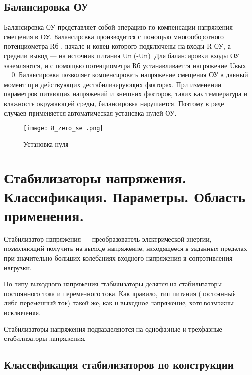 \subsection*{Балансировка ОУ}

Балансировка ОУ представляет собой операцию по компенсации напряжения смещения в ОУ. Балансировка производится с помощью многооборотного потенциометра Rб , начало и конец которого подключены на входы R ОУ, а средний вывод --- на источник питания Un (-Un). Для балансировки входы ОУ заземляются, и с помощью потенциометра Rб устанавливается напряжение Uвых = 0. Балансировка позволяет компенсировать напряжение смещения ОУ в данный момент при действующих дестабилизирующих факторах. При изменении параметров питающих напряжений и внешних факторов, таких как температура и влажность окружающей среды, балансировка нарушается. Поэтому в ряде случаев применяется автоматическая установка нулей ОУ.

\begin{figure}[H]
\centering
\texttt{[image: 8\_zero\_set.png]}
\caption{Установка нуля}
\label{fig:8_zero_set}
\end{figure}


\section{Стабилизаторы напряжения. Классификация. Параметры. Область применения.}

Стабилизатор напряжения --- преобразователь электрической энергии, позволяющий получить на выходе напряжение, находящееся в заданных пределах при значительно больших колебаниях входного напряжения и сопротивления нагрузки.

По типу выходного напряжения стабилизаторы делятся на стабилизаторы постоянного тока и переменного тока. Как правило, тип питания (постоянный либо переменный ток) такой же, как и выходное напряжение, хотя возможны исключения.

Стабилизаторы напряжения подразделяются на однофазные и трехфазные стабилизаторы напряжения.

\subsection*{Классификация стабилизаторов по конструкции}

